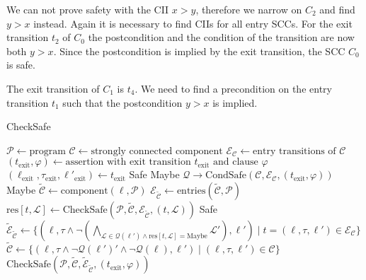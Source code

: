 We can not prove safety with the CII $x > y$, therefore we narrow on $C_2$ and find $y > x$ instead.
Again it is necessary to find CIIs for all entry SCCs.
For the exit transition $t_2$ of $C_0$ the postcondition and the condition of the transition are now both $y > x$.
Since the postcondition is implied by the exit transition, the SCC $C_0$ is safe.

The exit transition of $C_1$ is $t_4$.
We need to find a precondition on the entry transition $t_1$ such that the postcondition $y > x$ is implied.


\begin{algorithm}
\caption{CheckSafe}\label{checksafe}
\begin{algorithmic}[1]
\State $\mathcal{P} \gets \text{program}$
\State $\mathcal{C} \gets \text{strongly connected component}$
\State $\mathcal{E}_\mathcal{C} \gets \text{entry transitions of } \mathcal{C}$
\State $(t_\text{exit}, \varphi) \gets \text{assertion with exit transition } t_\text{exit} \text{ and clause } \varphi$
\State $(\ell_\text{exit}, \tau_\text{exit}, \ell'_\text{exit}) \gets t_\text{exit}$
  \Return Safe
  \Return Maybe
\EndIf
\State $\mathcal{Q} \rightarrow \text{CondSafe}(\mathcal{C}, \mathcal{E}_\mathcal{C}, (t_\text{exit}, \varphi))$
  \Return Maybe
\EndIf
{}
  \State $\tilde{\mathcal{C}} \gets \text{component}(\ell, \mathcal{P})$
  \State $\mathcal{E}_{\tilde{\mathcal{C}}} \gets \text{entries}(\tilde{\mathcal{C}}, \mathcal{P})$
  \State $\text{res}[t, \mathcal{L}] \gets \text{CheckSafe}(\mathcal{P}, \tilde{\mathcal{C}}, \mathcal{E}_{\tilde{\mathcal{C}}}, (t, \mathcal{L}))$
\EndFor
{}
  \Return Safe
\Else
  \State $\tilde{\mathcal{E}}_{\tilde{\mathcal{C}}} \gets \lbrace (\ell, \tau \wedge \neg (\bigwedge_{\mathcal{L} \in \mathcal{Q}(\ell') \wedge \text{res}[t, \mathcal{L}]=\text{Maybe}}{\mathcal{L}'}), \ell') \mid t = (\ell, \tau, \ell') \in \mathcal{E}_\mathcal{C} \rbrace$
  \State $\tilde{\mathcal{C}} \gets \lbrace (\ell, \tau \wedge \neg\mathcal{Q}(\ell')' \wedge \neg\mathcal{Q}(\ell), \ell') \mid (\ell, \tau, \ell') \in \mathcal{C} \rbrace$
\EndIf
\Return $\text{CheckSafe}(\mathcal{P}, \tilde{\mathcal{C}}, \tilde{\mathcal{E}}_{\tilde{\mathcal{C}}}, (t_\text{exit}, \varphi))$
\end{algorithmic}
\end{algorithm}

